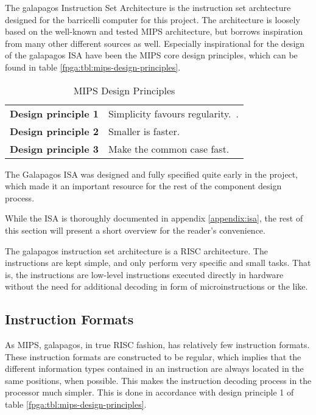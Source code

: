 The \Gls{galapagos} Instruction Set Architecture is the instruction set archtecture designed for the \Gls{barricelli} computer for this project.
The architecture is loosely based on the well-known and tested \gls{MIPS} architecture\cn, but borrows inspiration from many other different sources as well.
Especially inspirational for the design of the \Gls{galapagos} ISA have been the \gls{MIPS} core design principles, which can be found in table \vref{fpga:tbl:mips-design-principles}.

\begin{table}[H]
\centering
    \begin{tabular}{l l} 
     \textbf{Design principle 1} & Simplicity favours regularity.~\cite[p.~79]{compOrgDes}. \\
     \textbf{Design principle 2} & Smaller is faster.~\cite[p.~81]{compOrgDes} \\
     \textbf{Design principle 3} & Make the common case fast.~\cite[p.~86]{compOrgDes} \\
    \hline
\end{tabular}
    \caption{MIPS Design Principles}
    \label{fpga:tbl:mips-design-principles}
\end{table}

The Galapagos ISA was designed and fully specified quite early in the project, which made it an important resource for the rest of the component design process.

While the ISA is thoroughly documented in appendix \vref{appendix:isa}, the rest of this section will present a short overview for the reader's convenience.

The \Gls{galapagos} instruction set architecture is a RISC architecture.
The instructions are kept simple, and only perform very specific and small tasks.
That is, the instructions are low-level instructions executed directly in hardware without the need for additional decoding in form of microinstructions or the like.

\subsection{Instruction Formats}

As \Gls{MIPS}, \Gls{galapagos}, in true \gls{RISC} fashion, has relatively few instruction formats.
These instruction formats are constructed to be regular, which implies that the different information types contained in an instruction are always located in the same positions, when possible.
This makes the instruction decoding process in the processor much simpler.
This is done in accordance with design principle 1 of table \vref{fpga:tbl:mips-design-principles}.

